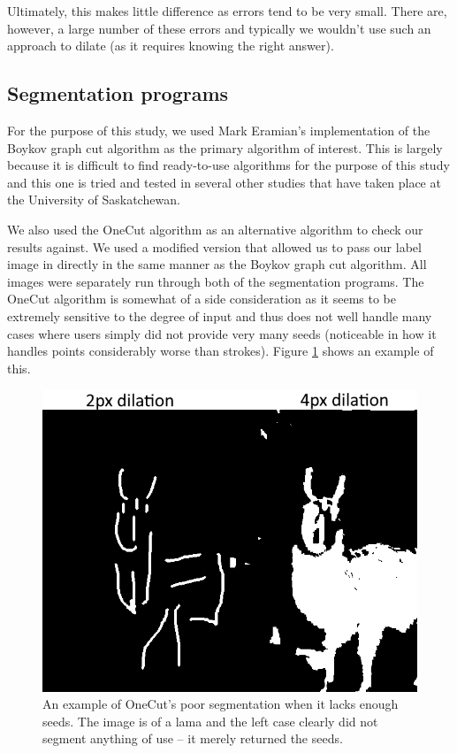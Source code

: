 \documentclass[12pt,a4paper,notitlepage]{article}
\begin{document}
Ultimately, this makes little difference as errors tend to be very small. There are, however, a large number of these errors and typically we wouldn't use such an approach to dilate (as it requires knowing the right answer).

\subsection{Segmentation programs}
For the purpose of this study, we used Mark Eramian's implementation of the Boykov graph cut algorithm\cite{boykov_algorithm} as the primary algorithm of interest. This is largely because it is difficult to find ready-to-use algorithms for the purpose of this study and this one is tried and tested in several other studies that have taken place at the University of Saskatchewan\cite{rau}\cite{yuanxia}.

We also used the OneCut algorithm\cite{onecut} as an alternative algorithm to check our results against. We used a modified version\cite{onecutModified} that allowed us to pass our label image in directly in the same manner as the Boykov graph cut algorithm. All images were separately run through both of the segmentation programs. The OneCut algorithm is somewhat of a side consideration as it seems to be extremely sensitive to the degree of input and thus does not well handle many cases where users simply did not provide very many seeds (noticeable in how it handles points considerably worse than strokes). Figure \ref{fig:onecut_segment_comparison} shows an example of this.

\begin{figure}[h]
	\begin{center}
		\includegraphics[width=.6\linewidth]{onecut_segment_comparison}
	\end{center}
	\caption{An example of OneCut's poor segmentation when it lacks enough seeds. The image is of a lama and the left case clearly did not segment anything of use -- it merely returned the seeds.}
	\label{fig:onecut_segment_comparison}
\end{figure}
\end{document}
